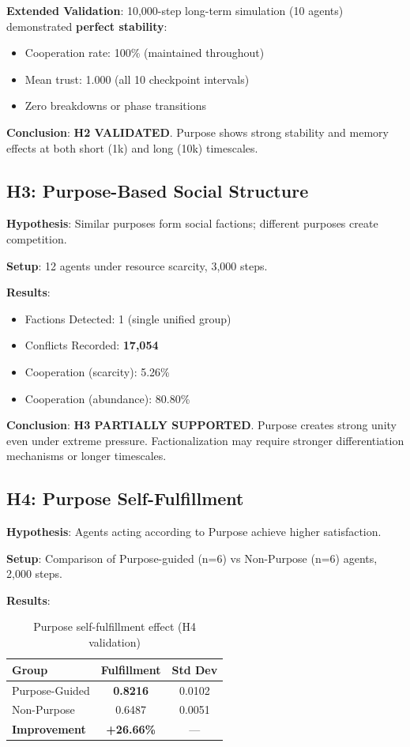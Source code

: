 \documentclass{article}
\begin{document}
\textbf{Extended Validation}: 10,000-step long-term simulation (10 agents) demonstrated \textbf{perfect stability}:
\begin{itemize}
    \item Cooperation rate: 100\% (maintained throughout)
    \item Mean trust: 1.000 (all 10 checkpoint intervals)
    \item Zero breakdowns or phase transitions
\end{itemize}

\textbf{Conclusion}: \textbf{H2 VALIDATED}. Purpose shows strong stability and memory effects at both short (1k) and long (10k) timescales.

\subsection{H3: Purpose-Based Social Structure}

\textbf{Hypothesis}: Similar purposes form social factions; different purposes create competition.

\textbf{Setup}: 12 agents under resource scarcity, 3,000 steps.

\textbf{Results}:
\begin{itemize}
    \item Factions Detected: 1 (single unified group)
    \item Conflicts Recorded: \textbf{17,054}
    \item Cooperation (scarcity): 5.26\%
    \item Cooperation (abundance): 80.80\%
\end{itemize}

\textbf{Conclusion}: \textbf{H3 PARTIALLY SUPPORTED}. Purpose creates strong unity even under extreme pressure. Factionalization may require stronger differentiation mechanisms or longer timescales.

\subsection{H4: Purpose Self-Fulfillment}

\textbf{Hypothesis}: Agents acting according to Purpose achieve higher satisfaction.

\textbf{Setup}: Comparison of Purpose-guided (n=6) vs Non-Purpose (n=6) agents, 2,000 steps.

\textbf{Results}:

\begin{table}[h]
\centering
\begin{tabular}{lcc}
\toprule
\textbf{Group} & \textbf{Fulfillment} & \textbf{Std Dev} \\
\midrule
Purpose-Guided & \textbf{0.8216} & 0.0102 \\
Non-Purpose & 0.6487 & 0.0051 \\
\textbf{Improvement} & \textbf{+26.66\%} & — \\
\bottomrule
\end{tabular}
\caption{Purpose self-fulfillment effect (H4 validation)}
\end{table}
\end{document}
